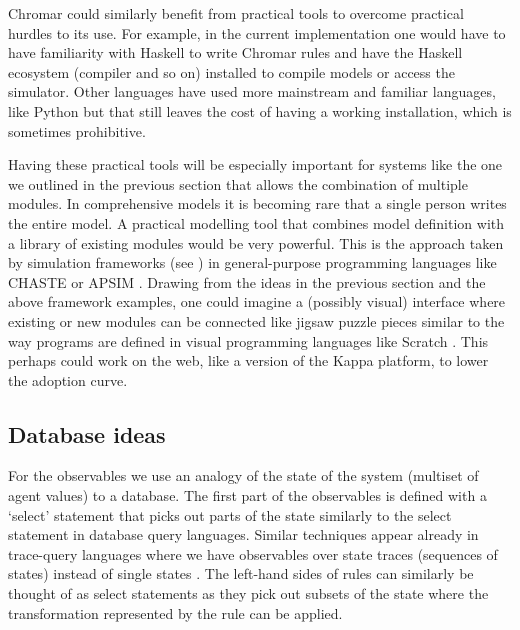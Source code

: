 Chromar could similarly benefit from practical tools to overcome practical
hurdles to its use. For example, in the current implementation one would have to
have familiarity with Haskell to write Chromar rules and have the Haskell
ecosystem (compiler and so on) installed to compile models or access the
simulator. Other languages have used more mainstream and familiar languages,
like Python \citep[Kappa or L-systems in Python;][]{lopez_programming_2013,
  boudon2012py} but that still leaves the cost of having a working installation,
which is sometimes prohibitive.

Having these practical tools will be especially important for systems like the
one we outlined in the previous section that allows the combination of multiple
modules. In comprehensive models it is becoming rare that a single person writes
the entire model. A practical modelling tool that combines model definition with
a library of existing modules would be very powerful. This is the approach taken
by simulation frameworks (see ) in general-purpose
programming languages like CHASTE \citep[suite of software for heart
simulation][]{mirams2013chaste} or APSIM \citep[crop
modelling][]{keating_overview_2003}. Drawing from the ideas in the previous
section and the above framework examples, one could imagine a (possibly visual)
interface where existing or new modules can be connected like jigsaw puzzle
pieces similar to the way programs are defined in visual programming languages
like Scratch \citep{maloney_scratch_2010}. This perhaps could work on the web,
like a version of the Kappa platform, to lower the adoption curve.

\subsection{Database ideas}
For the observables we use an analogy of the state of the system (multiset of
agent values) to a database. The first part of the observables is defined with
a `select' statement that picks out parts of the state similarly to the
select statement in database query languages. Similar techniques appear already
in trace-query languages where we have observables over state traces (sequences
of states) instead of single states \citep{laurent_trace_2018}. The left-hand
sides of rules can similarly be thought of as select statements as they pick out
subsets of the state where the transformation represented by the rule can be
applied.

